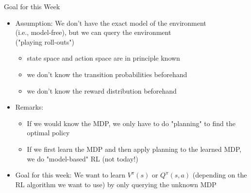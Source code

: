 \documentclass[aspectratio=169]{../latex_main/tntbeamer}  %
\begin{document}
\begin{frame}[c]{Goal for this Week}

\begin{itemize}
	\item Assumption: We don't have the exact model of the environment\\ (i.e., model-free), but we can query the environment\\ ("playing roll-outs")
	\begin{itemize}
		\item state space and action space are in principle known
		\item we don't know the transition probabilities beforehand
		\item we don't know the reward distribution beforehand
	\end{itemize}
	\medskip
	\pause
	\item Remarks:
	\begin{itemize}
		\item If we would know the MDP, we only have to do "planning" to find the optimal policy
		\item If we first learn the MDP and then apply planning to the learned MDP, we do "model-based" RL (not today!)
	\end{itemize}
	\medskip\pause
	\item Goal for this week: We want to learn $V^\pi(s)$ or $Q^\pi(s,a)$ (depending on the RL algorithm we want to use) by only querying the unknown MDP
\end{itemize}


\end{frame}

\end{document}

